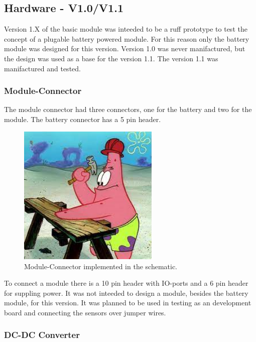 \subsection{Hardware - V1.0/V1.1}
    Version 1.X of the basic module was inteeded to be a ruff prototype to test the concept of a 
    plugable battery powered module. For this reason only the battery module was designed for this
    version. Version 1.0 was never manifactured, but the design was used as a base for the
    version 1.1. The version 1.1 was manifactured and tested. 

    \subsubsection{Module-Connector}
        The module connector had three connectors, one for the battery and two for the
        module. The battery connector has a 5 pin header. 

        \begin{figure}[H]
            \centering
            \includegraphics[width=0.6\textwidth]{assets/HW/TBD2.png}
            \caption{Module-Connector implemented in the schematic.}
        \end{figure}


        To connect a module there is a 10 pin header with IO-ports and a 6 pin header 
        for suppling power. It was not inteeded to design a module, besides the battery module,
        for this version. It was planned to be used in testing as an development board and connecting
        the sensors over jumper wires.

    \subsubsection{DC-DC Converter}
        
